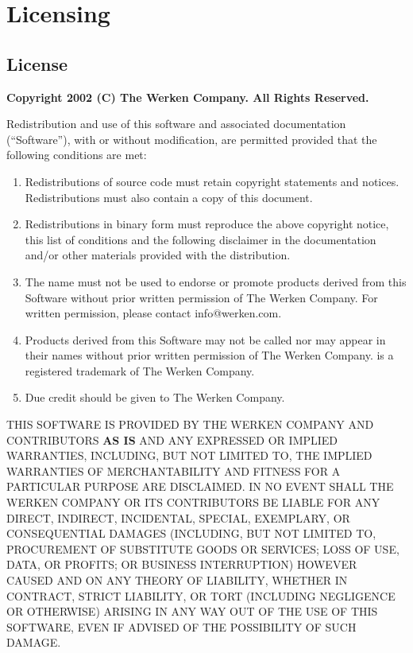 \chapter{Licensing}

\section{License}

\small

{\center \textbf{Copyright 2002 (C) The Werken Company. All Rights Reserved.}\\}

\bigskip

Redistribution and use of this software and associated documentation
(``Software''), with or without modification, are permitted provided
that the following conditions are met:

\begin{enumerate}
	\item Redistributions of source code must retain copyright
   statements and notices.  Redistributions must also contain a
   copy of this document.
 
	\item Redistributions in binary form must reproduce the
   above copyright notice, this list of conditions and the
   following disclaimer in the documentation and/or other
   materials provided with the distribution.
 
	\item The name \drools{} must not be used to endorse or promote
   products derived from this Software without prior written
   permission of The Werken Company.  For written permission,
   please contact info@werken.com.
 
	\item Products derived from this Software may not be called \drools{}
   nor may \drools{} appear in their names without prior written
   permission of The Werken Company. \drools{} is a registered
   trademark of The Werken Company.
 
	\item Due credit should be given to The Werken Company. 
\end{enumerate}
 
THIS SOFTWARE IS PROVIDED BY THE WERKEN COMPANY AND CONTRIBUTORS
\textbf{AS IS} AND ANY EXPRESSED OR IMPLIED WARRANTIES, INCLUDING, BUT
NOT LIMITED TO, THE IMPLIED WARRANTIES OF MERCHANTABILITY AND
FITNESS FOR A PARTICULAR PURPOSE ARE DISCLAIMED.  IN NO EVENT SHALL
THE WERKEN COMPANY OR ITS CONTRIBUTORS BE LIABLE FOR ANY DIRECT,
INDIRECT, INCIDENTAL, SPECIAL, EXEMPLARY, OR CONSEQUENTIAL DAMAGES
(INCLUDING, BUT NOT LIMITED TO, PROCUREMENT OF SUBSTITUTE GOODS OR
SERVICES; LOSS OF USE, DATA, OR PROFITS; OR BUSINESS INTERRUPTION)
HOWEVER CAUSED AND ON ANY THEORY OF LIABILITY, WHETHER IN CONTRACT,
STRICT LIABILITY, OR TORT (INCLUDING NEGLIGENCE OR OTHERWISE)
ARISING IN ANY WAY OUT OF THE USE OF THIS SOFTWARE, EVEN IF ADVISED
OF THE POSSIBILITY OF SUCH DAMAGE.

